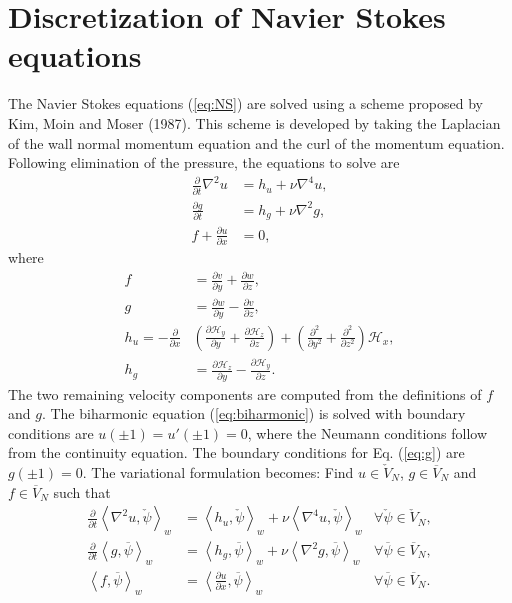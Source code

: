\documentclass[11pt, oneside]{article}
\newcommand{\N}[1]{\check{#1}}
\newcommand{\D}[1]{\overline{#1}}
\begin{document}
\section{Discretization of Navier Stokes equations}
\label{sec:discretizationNS}
The Navier Stokes equations (\ref{eq:NS}) are solved using a scheme 
proposed by Kim, Moin and Moser (1987). This scheme is developed by taking the 
Laplacian of the wall normal momentum equation and the curl of the momentum 
equation. Following elimination of the pressure, the equations to solve are 
\begin{align}
\frac{\partial}{\partial t} \nabla^2 u &= h_u + \nu \nabla^4 u, 
\label{eq:biharmonic} \\
\frac{\partial g}{\partial t} &= h_g + \nu \nabla^2 g, \label{eq:g} \\
f + \frac{\partial u}{\partial x} &= 0, \label{eq:f}
\end{align}
where
\begin{align}
f &= \frac{\partial v}{\partial y} + \frac{\partial w}{\partial z}, \\
g &= \frac{\partial w}{\partial y} - \frac{\partial v}{\partial z}, \\
h_u = -\frac{\partial}{\partial x} &\left( \frac{\partial 
\mathcal{H}_y}{\partial y} + \frac{\partial \mathcal{H}_z}{\partial z} \right) 
+ \left(\frac{\partial^2}{\partial y^2} + \frac{\partial^2}{\partial z^2} 
\right) \mathcal{H}_x , \label{eq:hu}
\\
h_g &= \frac{\partial \mathcal{H}_z}{\partial y} - \frac{\partial 
\mathcal{H}_y}{\partial z}. \label{eq:hg}
\end{align}
The two remaining velocity components are computed from the definitions of $f$ 
and $g$. The biharmonic equation (\ref{eq:biharmonic}) is solved with boundary 
conditions are $u(\pm 1) = u'(\pm 1) = 0$, where the Neumann conditions follow 
from the continuity equation. The boundary conditions for Eq. (\ref{eq:g}) are 
$g(\pm 1) = 0$. The variational formulation becomes: Find ${u} \in 
\N{V}_N$, ${g} \in \D{V}_N$ and ${f} \in \D{V}_N$ such that
\begin{align}
	\frac{\partial }{\partial t} \left< \nabla^2 u, \N{\psi}\right>_w &= 
	\left<h_u, \N{\psi} \right>_w + \nu \left<\nabla^4u, \N{\psi}\right>_w 
	&\forall \N{\psi} \in \N{V}_N, \label{eq:u1} \\
	\frac{\partial}{\partial t}\left<g, \D{\psi}\right>_w &= \left<h_g, 
	\D{\psi}\right>_w + \nu 
	\left<\nabla^2 g, \D{\psi}\right>_w &\forall \D{\psi} \in \D{V}_N ,
	\label{eq:g1} \\
	\left<f, \D{\psi}\right>_w &= \left<\frac{\partial u}{\partial x}, 
	\D{\psi}\right>_w &\forall \D{\psi} \in \D{V}_N. \label{eq:f1}
\end{align}
\end{document}
